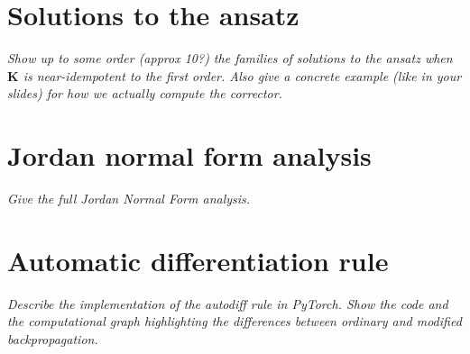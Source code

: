 \documentclass{article}
\newcommand{\vK}{\mathbf{K}}
\begin{document}
\printbibliography

\newpage
\appendix

\section{Solutions to the ansatz}
\label{app:solutions}
\textit{Show up to some order (approx 10?) the families of solutions to the ansatz when $\vK$ is near-idempotent to the first order. Also give a concrete example (like in your slides) for how we actually compute the corrector.}

\section{Jordan normal form analysis}
\label{app:jordan}
\textit{Give the full Jordan Normal Form analysis.}

\section{Automatic differentiation rule}
\label{app:autodiff-rule}
\textit{Describe the implementation of the autodiff rule in PyTorch. Show the code and the computational graph highlighting the differences between ordinary and modified backpropagation.}
\end{document}
